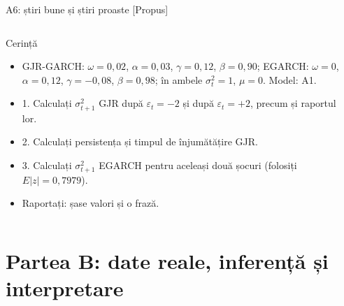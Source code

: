 \begin{frame}{A6: știri bune și știri proaste [Propus]}
\propsub
\itemsize{\scriptsize}
\begin{columns}[T]
\begin{column}{\taskw}
\begin{block}{Cerință}
\begin{itemize}
    \item GJR-GARCH: $\omega = 0{,}02$, $\alpha = 0{,}03$, $\gamma = 0{,}12$, $\beta = 0{,}90$; EGARCH: $\omega = 0$, $\alpha = 0{,}12$, $\gamma = -0{,}08$, $\beta = 0{,}98$; în ambele $\sigma_t^2 = 1$, $\mu = 0$. Model: A1.
    \item 1. Calculați $\sigma_{t+1}^2$ GJR după $\varepsilon_t = -2$ și după $\varepsilon_t = +2$, precum și raportul lor.
    \item 2. Calculați persistența și timpul de înjumătățire GJR.
    \item 3. Calculați $\sigma_{t+1}^2$ EGARCH pentru aceleași două șocuri (folosiți $E|z| = 0{,}7979$).
    \item Raportați: șase valori și o frază.
\end{itemize}
\end{block}
\end{column}
\begin{column}{\solw}
\end{column}
\end{columns}
\end{frame}


\section{Partea B: date reale, inferență și interpretare}

